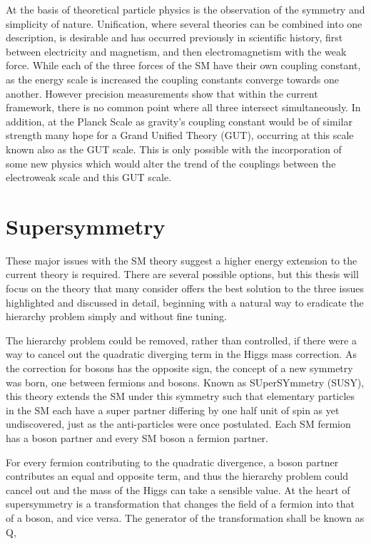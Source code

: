 At the basis of theoretical particle physics is the observation of the symmetry and simplicity of nature. Unification, where several theories can be combined into one description, is desirable and has occurred previously in scientific history, first between electricity and magnetism, and then electromagnetism with the weak force. While each of the three forces of the SM have their own coupling constant, as the energy scale is increased the coupling constants converge towards one another. However precision measurements show that within the current framework,  there is no common point where all three intersect simultaneously. In addition, at the Planck Scale as gravity's coupling constant would be of similar strength many hope for a Grand Unified Theory (GUT),  occurring at this scale known also as the GUT scale. This is only possible with the incorporation of some new physics which would alter the trend of the couplings between the electroweak scale and this GUT scale. 



\section{Supersymmetry}

These major issues with the SM theory suggest a higher energy extension to the current theory is required. There are several possible options, but this thesis will focus on the theory that many consider offers the best solution to the three issues highlighted and discussed in detail, beginning with a natural way to eradicate the hierarchy problem simply and without fine tuning.

The hierarchy problem could be removed, rather than controlled, if there were a way to cancel out the quadratic diverging term in the Higgs mass correction. As the correction for bosons has the opposite sign, the concept of a new symmetry was born, one between fermions and bosons. Known as SUperSYmmetry (SUSY), this theory extends the SM under this symmetry such that elementary particles in the SM each have a super partner differing by one half unit of spin as yet undiscovered, just as the anti-particles were once postulated. Each SM fermion has a boson partner and every SM boson a fermion partner. 

For every fermion contributing to the quadratic divergence, a boson partner contributes an equal and opposite term, and thus the hierarchy problem could cancel out and the mass of the Higgs can take a sensible value. At the heart of supersymmetry is a transformation that changes the field of a fermion into that of a boson, and vice versa. The generator of the transformation shall be known as Q,

